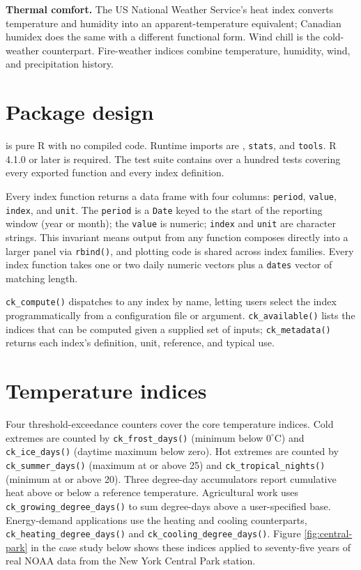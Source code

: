 \textbf{Thermal comfort.} The US National Weather Service's heat index
\citep{rothfusz1990heat} converts temperature and humidity into an
apparent-temperature equivalent; Canadian humidex
\citep{masterton1979humidex} does the same with a different functional
form. Wind chill \citep{osczevski2005new} is the cold-weather
counterpart. Fire-weather indices combine temperature, humidity,
wind, and precipitation history.

\section{Package design}\label{package-design}

 is pure R with no compiled code. Runtime
imports are , \texttt{stats}, and \texttt{tools}. R 4.1.0 or later
is required. The test suite contains over a hundred tests covering
every exported function and every index definition.

Every index function returns a data frame with four columns:
\texttt{period}, \texttt{value}, \texttt{index}, and \texttt{unit}. The \texttt{period} is a \texttt{Date}
keyed to the start of the reporting window (year or month); the
\texttt{value} is numeric; \texttt{index} and \texttt{unit} are character strings. This
invariant means output from any function composes directly into a
larger panel via \texttt{rbind()}, and plotting code is shared across
index families. Every index function takes one or two daily
numeric vectors plus a \texttt{dates} vector of matching length.

\texttt{ck\_compute()} dispatches to any index by name, letting users
select the index programmatically from a configuration file or
argument. \texttt{ck\_available()} lists the indices that can be computed
given a supplied set of inputs; \texttt{ck\_metadata()} returns each
index's definition, unit, reference, and typical use.

\section{Temperature indices}\label{temperature-indices}

Four threshold-exceedance counters cover the core temperature
indices. Cold extremes are counted by \texttt{ck\_frost\_days()} (minimum
below \(0^\circ\)C) and \texttt{ck\_ice\_days()} (daytime maximum below
zero). Hot extremes are counted by \texttt{ck\_summer\_days()} (maximum at
or above 25) and \texttt{ck\_tropical\_nights()} (minimum at or above 20).
Three degree-day accumulators report cumulative heat above or
below a reference temperature. Agricultural work uses
\texttt{ck\_growing\_degree\_days()} to sum degree-days above a
user-specified base. Energy-demand applications use the heating
and cooling counterparts, \texttt{ck\_heating\_degree\_days()} and
\texttt{ck\_cooling\_degree\_days()}. Figure \ref{fig:central-park} in the
case study below shows these indices applied to seventy-five years
of real NOAA data from the New York Central Park station.

